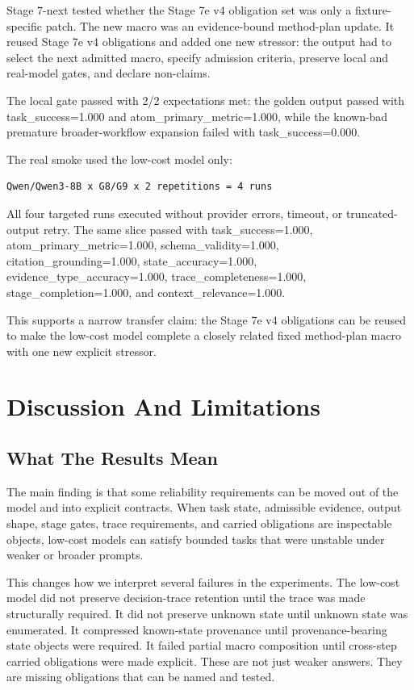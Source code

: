 \documentclass[11pt]{article}
\begin{document}
Stage 7-next tested whether the Stage 7e v4 obligation set was only a fixture-specific patch. The new macro was an evidence-bound method-plan update. It reused Stage 7e v4 obligations and added one new stressor: the output had to select the next admitted macro, specify admission criteria, preserve local and real-model gates, and declare non-claims.

The local gate passed with 2/2 expectations met: the golden output passed with task\_success=1.000 and atom\_primary\_metric=1.000, while the known-bad premature broader-workflow expansion failed with task\_success=0.000.

The real smoke used the low-cost model only:

\begin{verbatim}
Qwen/Qwen3-8B x G8/G9 x 2 repetitions = 4 runs
\end{verbatim}

All four targeted runs executed without provider errors, timeout, or truncated-output retry. The same slice passed with task\_success=1.000, atom\_primary\_metric=1.000, schema\_validity=1.000, citation\_grounding=1.000, state\_accuracy=1.000, evidence\_type\_accuracy=1.000, trace\_completeness=1.000, stage\_completion=1.000, and context\_relevance=1.000.

This supports a narrow transfer claim: the Stage 7e v4 obligations can be reused to make the low-cost model complete a closely related fixed method-plan macro with one new explicit stressor.

\section{Discussion And Limitations}

\subsection{What The Results Mean}

The main finding is that some reliability requirements can be moved out of the model and into explicit contracts. When task state, admissible evidence, output shape, stage gates, trace requirements, and carried obligations are inspectable objects, low-cost models can satisfy bounded tasks that were unstable under weaker or broader prompts.

This changes how we interpret several failures in the experiments. The low-cost model did not preserve decision-trace retention until the trace was made structurally required. It did not preserve unknown state until unknown state was enumerated. It compressed known-state provenance until provenance-bearing state objects were required. It failed partial macro composition until cross-step carried obligations were made explicit. These are not just weaker answers. They are missing obligations that can be named and tested.
\end{document}
